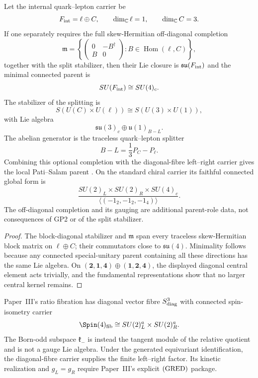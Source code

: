 \documentclass[12pt,a4paper]{article}
\begin{document}
\begin{theorem}
\label{p5:thm:pati-salam-parent-carrier}
Let the internal quark--lepton carrier be
\[
F_{\rm int}=\ell\oplus C,
\qquad
\dim_{\mathbb C}\ell=1,
\qquad
\dim_{\mathbb C}C=3.
\]
If one separately requires the full skew-Hermitian off-diagonal completion
\[
\mathfrak m=
\left\{
\begin{pmatrix}
0&-B^\dagger\\ B&0
\end{pmatrix}:B\in\operatorname{Hom}(\ell,C)
\right\},
\]
together with the split stabilizer, then their Lie closure is
\(\mathfrak{su}(F_{\rm int})\) and the minimal connected parent is
\[
SU(F_{\rm int})\cong SU(4)_c.
\]
The stabilizer of the splitting is
\[
S(U(C)\times U(\ell))\cong S(U(3)\times U(1)),
\]
with Lie algebra
\[
\mathfrak{su}(3)_c\oplus\mathfrak u(1)_{B-L}.
\]
The abelian generator is the traceless quark--lepton splitter
\[
B-L=\frac13P_C-P_\ell.
\]
Combining this optional completion with the diagonal-fibre left--right carrier
gives the local Pati--Salam parent \cite{PatiSalam1974}.  On the standard
chiral carrier its faithful connected global form is
\[
\frac{SU(2)_L\times SU(2)_R\times SU(4)_c}
{\langle(-1_2,-1_2,-1_4)\rangle}.
\]
The off-diagonal completion and its gauging are additional parent-role data,
not consequences of GP2 or of the split stabilizer.
\end{theorem}

\begin{proof}
The block-diagonal stabilizer and \(\mathfrak m\) span every traceless
skew-Hermitian block matrix on \(\ell\oplus C\); their commutators close to
\(\mathfrak{su}(4)\).  Minimality follows because any connected
special-unitary parent containing all these directions has the same Lie
algebra.  On
\((\mathbf2,\mathbf1,\mathbf4)\oplus
(\mathbf1,\mathbf2,\mathbf4)\), the displayed diagonal central element acts
trivially, and the fundamental representations show that no larger central
kernel remains.
\end{proof}


\begin{corollary}
\label{p5:cor:diagonal-fibre-left-right-origin}
\label{p5:cor:born-antidiagonal-left-right-origin}
Paper~III's ratio fibration has diagonal vector fibre \(S^3_{\rm diag}\)
with connected spin-isometry carrier
\[
\Spin(4)_{\rm fib}\cong SU(2)^a_L\times SU(2)^a_R.
\]
The Born-odd subspace \(\mathfrak k_-\) is instead the tangent module of the
relative quotient and is not a gauge Lie algebra.  Under the generated
equivariant identification, the diagonal-fibre carrier supplies the finite
left--right factor.  Its kinetic realization and \(g_L=g_R\)
require Paper~III's explicit \(({\rm GRED})\) package.
\end{corollary}
\end{document}
